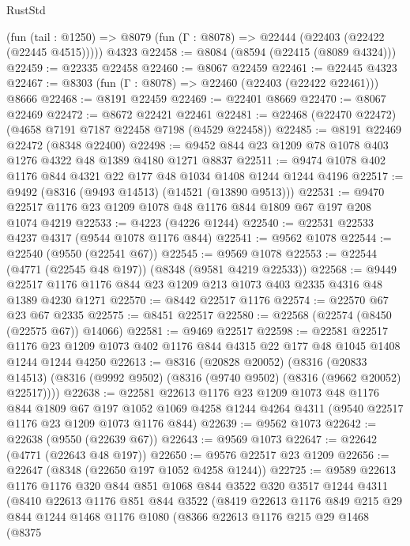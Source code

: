 \begin{lexlean}{RustStd}
\begin{coremodule}
    (fun (tail : @1250) => @8079 (fun (Γ : @8078) => @22444 (@22403 (@22422 (@22445 @4515)))))
    @4323
@22458 := @8084 (@8594 (@22415 (@8089 @4324)))
@22459 := @22335 @22458
@22460 := @8067 @22459
@22461 := @22445 @4323
@22467 := @8303 (fun (Γ : @8078) => @22460 (@22403 (@22422 @22461))) @8666
@22468 := @8191 @22459
@22469 := @22401 @8669
@22470 := @8067 @22469
@22472 := @8672 @22421 @22461
@22481 := @22468 (@22470 @22472) (@4658 @7191 @7187 @22458 @7198 (@4529 @22458))
@22485 := @8191 @22469 @22472 (@8348 @22400)
@22498 := @9452 @844 @23 @1209 @78 @1078 @403 @1276 @4322 @48 @1389 @4180 @1271 @8837
@22511 := @9474 @1078 @402 @1176 @844 @4321 @22 @177 @48 @1034 @1408 @1244 @1244 @4196
@22517 := @9492 (@8316 (@9493 @14513) (@14521 (@13890 @9513)))
@22531 := @9470 @22517 @1176 @23 @1209 @1078 @48 @1176 @844 @1809 @67 @197 @208 @1074 @4219
@22533 := @4223 (@4226 @1244)
@22540 := @22531 @22533 @4237 @4317 (@9544 @1078 @1176 @844)
@22541 := @9562 @1078
@22544 := @22540 (@9550 (@22541 @67))
@22545 := @9569 @1078
@22553 := @22544 (@4771 (@22545 @48 @197)) (@8348 (@9581 @4219 @22533))
@22568 := @9449 @22517 @1176 @1176 @844 @23 @1209 @213 @1073 @403 @2335 @4316 @48 @1389 @4230 @1271
@22570 := @8442 @22517 @1176
@22574 := @22570 @67 @23 @67 @2335
@22575 := @8451 @22517
@22580 := @22568 (@22574 (@8450 (@22575 @67)) @14066)
@22581 := @9469 @22517
@22598 := @22581
    @22517
    @1176
    @23
    @1209
    @1073
    @402
    @1176
    @844
    @4315
    @22
    @177
    @48
    @1045
    @1408
    @1244
    @1244
    @4250
@22613 := @8316
    (@20828 @20052)
    (@8316
      (@20833 @14513)
      (@8316 (@9992 @9502) (@8316 (@9740 @9502) (@8316 (@9662 @20052) @22517))))
@22638 := @22581
    @22613
    @1176
    @23
    @1209
    @1073
    @48
    @1176
    @844
    @1809
    @67
    @197
    @1052
    @1069
    @4258
    @1244
    @4264
    @4311
    (@9540 @22517 @1176 @23 @1209 @1073 @1176 @844)
@22639 := @9562 @1073
@22642 := @22638 (@9550 (@22639 @67))
@22643 := @9569 @1073
@22647 := @22642 (@4771 (@22643 @48 @197))
@22650 := @9576 @22517 @23 @1209
@22656 := @22647 (@8348 (@22650 @197 @1052 @4258 @1244))
@22725 := @9589
    @22613
    @1176
    @1176
    @320
    @844
    @851
    @1068
    @844
    @3522
    @320
    @3517
    @1244
    @4311
    (@8410
      @22613
      @1176
      @851
      @844
      @3522
      (@8419
        @22613
        @1176
        @849
        @215
        @29
        @844
        @1244
        @1468
        @1176
        @1080
        (@8366
          @22613
          @1176
          @215
          @29
          @1468
          (@8375

\end{coremodule}
\end{lexlean}
